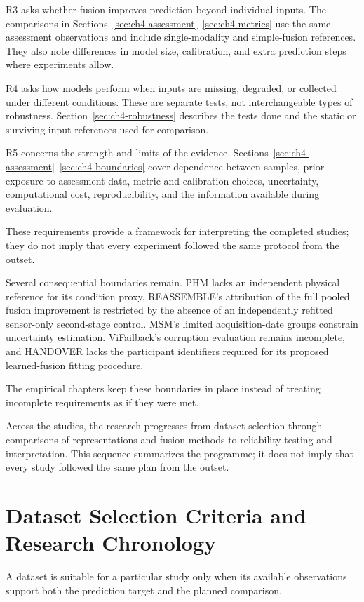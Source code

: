 R3 asks whether fusion improves prediction beyond individual inputs. The comparisons in Sections~\ref{sec:ch4-assessment}--\ref{sec:ch4-metrics} use the same assessment observations and include single-modality and simple-fusion references. They also note differences in model size, calibration, and extra prediction steps where experiments allow.

R4 asks how models perform when inputs are missing, degraded, or collected under different conditions. These are separate tests, not interchangeable types of robustness. Section~\ref{sec:ch4-robustness} describes the tests done and the static or surviving-input references used for comparison.

R5 concerns the strength and limits of the evidence. Sections~\ref{sec:ch4-assessment}--\ref{sec:ch4-boundaries} cover dependence between samples, prior exposure to assessment data, metric and calibration choices, uncertainty, computational cost, reproducibility, and the information available during evaluation.

These requirements provide a framework for interpreting the completed studies; they do not imply that every experiment followed the same protocol from the outset.

Several consequential boundaries remain. PHM lacks an independent physical reference for its condition proxy. REASSEMBLE’s attribution of the full pooled fusion improvement is restricted by the absence of an independently refitted sensor-only second-stage control. MSM’s limited acquisition-date groups constrain uncertainty estimation. ViFailback’s corruption evaluation remains incomplete, and HANDOVER lacks the participant identifiers required for its proposed learned-fusion fitting procedure.

The empirical chapters keep these boundaries in place instead of treating incomplete requirements as if they were met.

Across the studies, the research progresses from dataset selection through comparisons of representations and fusion methods to reliability testing and interpretation. This sequence summarizes the programme; it does not imply that every study followed the same plan from the outset.

\section{Dataset Selection Criteria and Research Chronology}
\label{sec:ch4-selection}

A dataset is suitable for a particular study only when its available observations support both the prediction target and the planned comparison.


